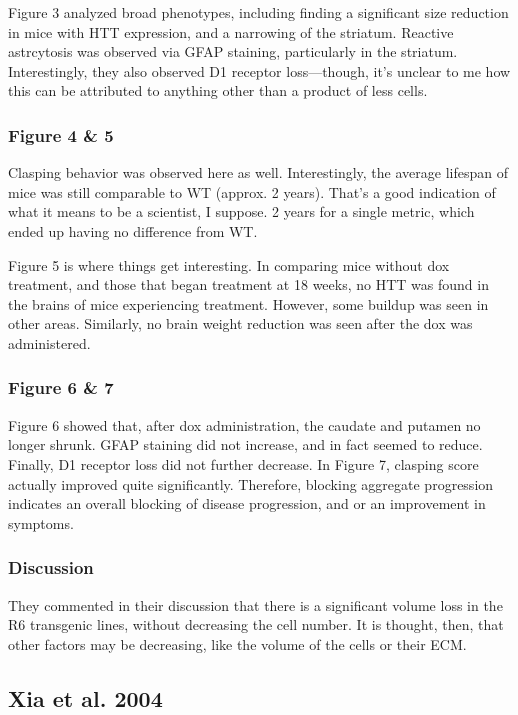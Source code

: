 \documentclass[12pt]{report}
\begin{document}
Figure 3 analyzed broad phenotypes, including finding a significant size reduction in mice with HTT expression, and a narrowing of the striatum. Reactive astrcytosis was observed via GFAP staining, particularly in the striatum. Interestingly, they also observed D1 receptor loss---though, it's unclear to me how this can be attributed to anything other than a product of less cells. 

\subsubsection{Figure 4 \& 5}

Clasping behavior was observed here as well. Interestingly, the average lifespan of mice was still comparable to WT (approx. 2 years). That's a good indication of what it means to be a scientist, I suppose. 2 years for a single metric, which ended up having no difference from WT.\newline

Figure 5 is where things get interesting. In comparing mice without dox treatment, and those that began treatment at 18 weeks, no HTT was found in the brains of mice experiencing treatment. However, some buildup was seen in other areas. Similarly, no brain weight reduction was seen after the dox was administered. 

\subsubsection{Figure 6 \& 7}

Figure 6 showed that, after dox administration, the caudate and putamen no longer shrunk. GFAP staining did not increase, and in fact seemed to reduce. Finally, D1 receptor loss did not further decrease. In Figure 7, clasping score actually improved quite significantly. Therefore, blocking aggregate progression indicates an overall blocking of disease progression, and or an improvement in symptoms. 

\subsubsection{Discussion}
They commented in their discussion that there is a significant volume loss in the R6 transgenic lines, without decreasing the cell number. It is thought, then, that other factors may be decreasing, like the volume of the cells or their ECM. 

\subsection{Xia et al. 2004}
\end{document}
